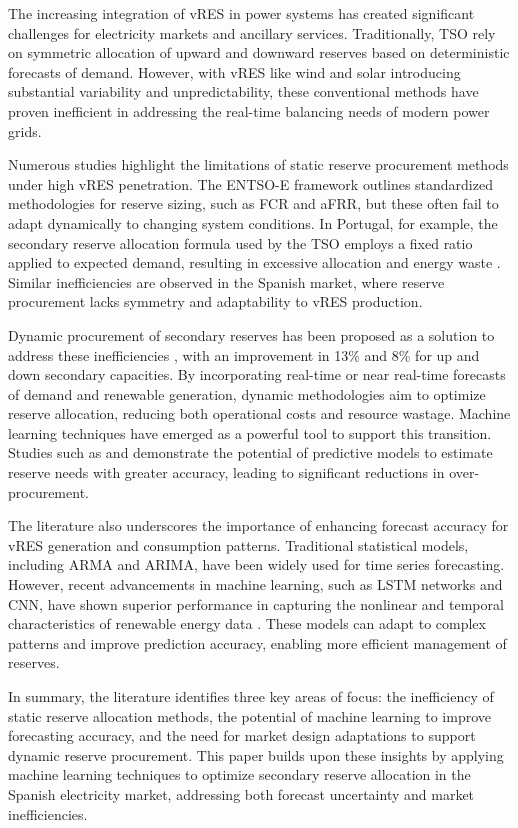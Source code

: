 The increasing integration of \gls{vRES} in power systems has created significant challenges for electricity markets and ancillary services. Traditionally, \gls{TSO} rely on symmetric allocation of upward and downward reserves based on deterministic forecasts of demand. However, with \gls{vRES} like wind and solar introducing substantial variability and unpredictability, these conventional methods have proven inefficient in addressing the real-time balancing needs of modern power grids.\par
Numerous studies highlight the limitations of static reserve procurement methods under high vRES penetration. The ENTSO-E framework \cite{handbook2009policy} outlines standardized methodologies for reserve sizing, such as \gls{FCR} and \gls{aFRR}, but these often fail to adapt dynamically to changing system conditions. In Portugal, for example, the secondary reserve allocation formula used by the \gls{TSO} employs a fixed ratio applied to expected demand, resulting in excessive allocation and energy waste %
. Similar inefficiencies are observed in the Spanish market, where reserve procurement lacks symmetry and adaptability to \gls{vRES} production.\par %
Dynamic procurement of secondary reserves has been proposed as a solution to address these inefficiencies \cite{Algarvio2022}, with an improvement in 13\% and 8\% for up and down secondary capacities. By incorporating real-time or near real-time forecasts of demand and renewable generation, dynamic methodologies aim to optimize reserve allocation, reducing both operational costs and resource wastage. Machine learning techniques have emerged as a powerful tool to support this transition. Studies such as \cite{DeVos2019} and \cite{Kruse2022} demonstrate the potential of predictive models to estimate reserve needs with greater accuracy, leading to significant reductions in over-procurement.\par
The literature also underscores the importance of enhancing forecast accuracy for \gls{vRES} generation and consumption patterns. Traditional statistical models, including ARMA and ARIMA, have been widely used for time series forecasting. However, recent advancements in machine learning, such as \gls{LSTM} networks and \gls{CNN}, have shown superior performance in capturing the nonlinear and temporal characteristics of renewable energy data \cite{Benti2023}. These models can adapt to complex patterns and improve prediction accuracy, enabling more efficient management of reserves.\par
In summary, the literature identifies three key areas of focus: the inefficiency of static reserve allocation methods, the potential of machine learning to improve forecasting accuracy, and the need for market design adaptations to support dynamic reserve procurement. This paper builds upon these insights by applying machine learning techniques to optimize secondary reserve allocation in the Spanish electricity market, addressing both forecast uncertainty and market inefficiencies.\par